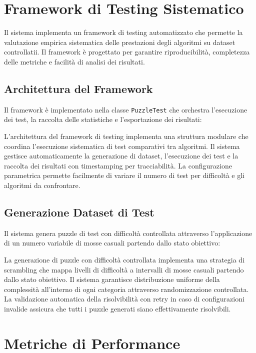 \documentclass[12pt,a4paper]{report}
\theoremstyle{definition}
\begin{document}
\section{Framework di Testing Sistematico}

Il sistema implementa un framework di testing automatizzato che permette la valutazione empirica sistematica delle prestazioni degli algoritmi su dataset controllatii. Il framework è progettato per garantire riproducibilità, completezza delle metriche e facilità di analisi dei risultati.

\subsection{Architettura del Framework}

Il framework è implementato nella classe \texttt{PuzzleTest} che orchestra l'esecuzione dei test, la raccolta delle statistiche e l'esportazione dei risultati:

L'architettura del framework di testing implementa una struttura modulare che coordina l'esecuzione sistematica di test comparativi tra algoritmi. Il sistema gestisce automaticamente la generazione di dataset, l'esecuzione dei test e la raccolta dei risultati con timestamping per tracciabilità. La configurazione parametrica permette facilmente di variare il numero di test per difficoltà e gli algoritmi da confrontare.

\subsection{Generazione Dataset di Test}

Il sistema genera puzzle di test con difficoltà controllata attraverso l'applicazione di un numero variabile di mosse casuali partendo dallo stato obiettivo:

La generazione di puzzle con difficoltà controllata implementa una strategia di scrambling che mappa livelli di difficoltà a intervalli di mosse casuali partendo dallo stato obiettivo. Il sistema garantisce distribuzione uniforme della complessità all'interno di ogni categoria attraverso randomizzazione controllata. La validazione automatica della risolvibilità con retry in caso di configurazioni invalide assicura che tutti i puzzle generati siano effettivamente risolvibili.

\section{Metriche di Performance}
\end{document}
